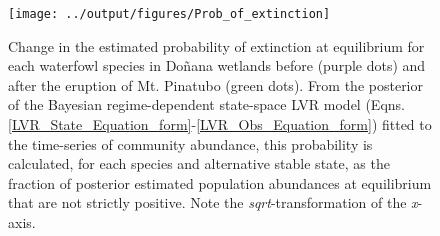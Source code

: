 \documentclass[12pt]{article}
\begin{document}
	\begin{figure}[t]
		\centering
		\texttt{[image: ../output/figures/Prob\_of\_extinction]}
		\caption[Change in probability of species extinction between two periods]{Change in the estimated probability of extinction at equilibrium for each waterfowl species in Doñana wetlands before (purple dots) and after the eruption of Mt. Pinatubo (green dots). From the posterior of the Bayesian regime-dependent state-space LVR model (Eqns. \ref{LVR_State_Equation_form}-\ref{LVR_Obs_Equation_form}) fitted to the time-series of community abundance, this probability is calculated, for each species and alternative stable state, as the fraction of posterior estimated population abundances at equilibrium that are not strictly positive. Note the \textit{sqrt}-transformation of the \textit{x}-axis.}
		\label{fig:Extinction}
	\end{figure}
\end{document}
